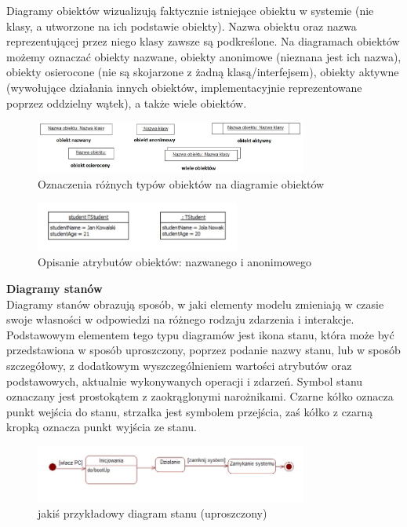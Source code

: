 \documentclass[a4paper,12pt,oneside]{book}
\begin{document}
                Diagramy obiektów wizualizują faktycznie istniejące obiektu w systemie (nie klasy, a utworzone na ich podstawie obiekty). Nazwa obiektu oraz nazwa reprezentującej przez niego klasy zawsze są podkreślone. Na diagramach obiektów możemy oznaczać obiekty nazwane, obiekty anonimowe (nieznana jest ich nazwa), obiekty osierocone (nie są skojarzone z żadną klasą/interfejsem), obiekty aktywne (wywołujące działania innych obiektów, implementacyjnie reprezentowane poprzez oddzielny wątek), a także wiele obiektów.
                \begin{figure}[H]
                    \centering
                    \includegraphics[width=0.8\textwidth]{images/d_objects.jpg}
                    \caption{Oznaczenia różnych typów obiektów na diagramie obiektów}
                    \label{fig:twojastara43}
                \end{figure}
                \begin{figure}[H]
                    \centering
                    \includegraphics[width=0.6\textwidth]{images/d_objects_atributes.jpg}
                    \caption{Opisanie atrybutów obiektów: nazwanego i anonimowego}
                    \label{fig:twojastara44}
                \end{figure}
				\textbf{Diagramy stanów}\\
                Diagramy stanów obrazują sposób, w jaki elementy modelu zmieniają w czasie swoje własności w odpowiedzi na różnego rodzaju zdarzenia i interakcje. Podstawowym elementem tego typu diagramów jest ikona stanu, która może być przedstawiona w sposób uproszczony, poprzez podanie nazwy stanu, lub w sposób szczegółowy, z dodatkowym wyszczególnieniem wartości atrybutów oraz podstawowych, aktualnie wykonywanych operacji i zdarzeń. Symbol stanu oznaczany jest prostokątem z zaokrąglonymi narożnikami. Czarne kółko oznacza punkt wejścia do stanu, strzałka jest symbolem przejścia, zaś kółko z czarną kropką oznacza punkt wyjścia ze stanu.\\
                \begin{figure}[H]
                    \centering
                    \includegraphics[width=0.8\textwidth]{images/d_state.jpg}
                    \caption{jakiś przykładowy diagram stanu (uproszczony)}
                    \label{fig:twojastara45}
                \end{figure}
\end{document}
